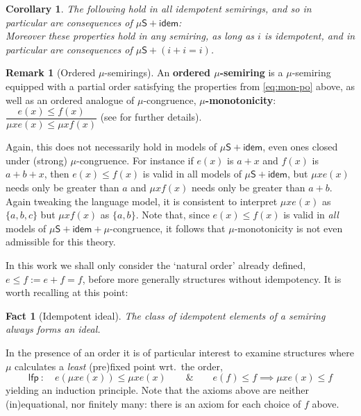 \documentclass[a4paper,10pt]{amsart}
\newcommand{\defname}[1]{\textbf{{#1}}}
\newcommand{\df}{:=}
\newtheorem{corollary}[theorem]{Corollary}
\newtheorem{fact}[theorem]{Fact}
\theoremstyle{definition}
\newtheorem{remark}[theorem]{Remark}
\newcommand{\basicax}{\mu\mathsf{S}}
\newcommand{\idem}{\mathsf{idem}}
\newcommand{\ind}{\mathsf{lfp}}
\begin{document}
\begin{corollary}
\label{intro-elim-props-for-+}
    The following hold in all idempotent semirings, and so in particular are consequences of $\basicax + \idem$:
    \begin{equation}
        \label{eq:props-of-nat-ord}
    \end{equation}
    Moreover these properties hold in \emph{any} semiring, as long as $i$ is idempotent, and in particular are consequences of $\basicax + (i+i=i)$.
\end{corollary}


\begin{remark}
    [Ordered $\mu$-semirings]
    An \defname{ordered $\mu$-semiring} is a $\mu$-semiring equipped with a partial order satisfying the properties from \cref{eq:mon-po} above, as well as an ordered analogue of $\mu$-congruence, \defname{$\mu$-monotonicity}: $\dfrac{e(x)\leq f(x)}{\mu x e(x)\leq\mu x f(x)}$ (see \cite{EsikKuich12:mod-aut-theory,EsikLeiss02} for further details).
    
    Again, this does not necessarily hold in models of $\basicax+\idem$, even ones closed under (strong) $\mu$-congruence.
    For instance if $e(x) $ is $a+x$ and $f(x) $ is $a + b + x$, then $e(x)\leq f(x)$ is valid in all models of $\basicax+\idem$, but $\mu x e(x)$ needs only be greater than $a$ and $\mu x f(x) $ needs only be greater than $a+b$.
    Again tweaking the language model, it is consistent to interpret $\mu x e(x) $ as $\{a,b,c\}$ but $\mu x f(x)$ as $\{a,b\}$.
    Note that, since $e(x) \leq f(x) $ is valid in \emph{all} models of $\basicax + \idem + \mu$-congruence, it follows that $\mu$-monotonicity is not even admissible for this theory.
\end{remark}


    
In this work we shall only consider the `natural order' already defined, $e\leq f \df e+f = f$, before more generally structures without idempotency.
It is worth recalling at this point:
\begin{fact}
[Idempotent ideal]
\label{rem:idempotents-form-ideal}
The class of idempotent elements of a semiring always forms an ideal.
\end{fact}


In the presence of an order it is of particular interest to examine structures where $\mu$ calculates a \emph{least} (pre)fixed point wrt.\ the order,
\[
\ind\ :\quad  
e(\mu x e(x)) \leq \mu x e(x)
\qquad \& \qquad
e(f)\leq f \implies \mu x e(x) \leq f
\]
yielding an induction principle.
Note that the axioms above are neither (in)equational, nor finitely many: there is an axiom for each choice of $f$ above.
\end{document}
